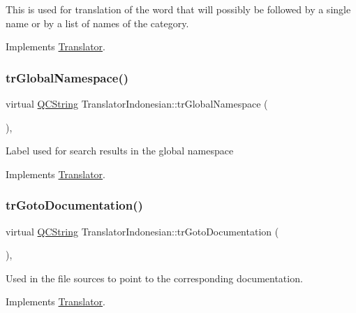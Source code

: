 This is used for translation of the word that will possibly be followed by a single name or by a list of names of the category. 

Implements \mbox{\hyperlink{class_translator}{Translator}}.

\mbox{\label{class_translator_indonesian_a13b2a122f31b14cd56ea93380a9410da}} 
\subsubsection{\texorpdfstring{trGlobalNamespace()}{trGlobalNamespace()}}
{\footnotesize\ttfamily virtual \mbox{\hyperlink{class_q_c_string}{Q\+C\+String}} Translator\+Indonesian\+::tr\+Global\+Namespace (\begin{DoxyParamCaption}{ }\end{DoxyParamCaption})\hspace{0.3cm}{\ttfamily [inline]}, {\ttfamily [virtual]}}

Label used for search results in the global namespace 

Implements \mbox{\hyperlink{class_translator}{Translator}}.

\mbox{\label{class_translator_indonesian_a3fef9ad8e0c41aa8d97590fae297742a}} 
\subsubsection{\texorpdfstring{trGotoDocumentation()}{trGotoDocumentation()}}
{\footnotesize\ttfamily virtual \mbox{\hyperlink{class_q_c_string}{Q\+C\+String}} Translator\+Indonesian\+::tr\+Goto\+Documentation (\begin{DoxyParamCaption}{ }\end{DoxyParamCaption})\hspace{0.3cm}{\ttfamily [inline]}, {\ttfamily [virtual]}}

Used in the file sources to point to the corresponding documentation. 

Implements \mbox{\hyperlink{class_translator}{Translator}}.

